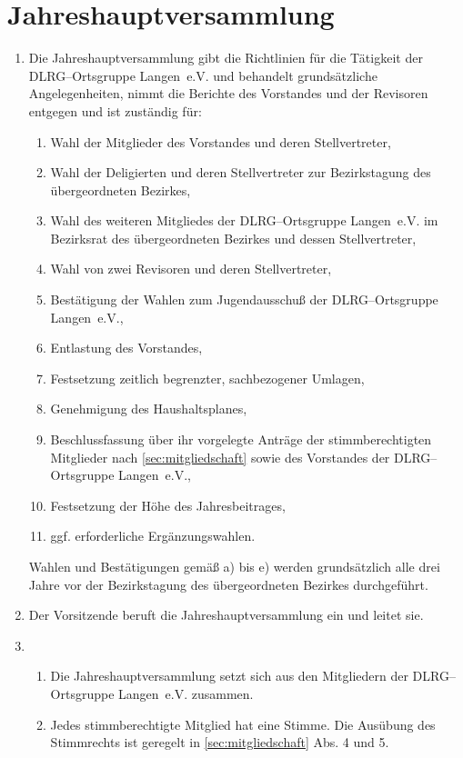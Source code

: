 \documentclass[%
12pt, %
a4paper, %
headsepline, %
footsepline, %
parskip, %
headings=normal, %
]{scrartcl}
\begin{document}
\section{Jahreshauptversammlung}
\label{sec:jahreshauptversammlung}
\begin{enumerate}
    \item Die Jahreshauptversammlung gibt die Richtlinien für die Tätigkeit der DLRG--Ortsgruppe Langen~e.V. und behandelt grundsätzliche Angelegenheiten, nimmt die Berichte des Vorstandes und der Revisoren entgegen und ist zuständig für: \begin{enumerate}[noitemsep]
        \item Wahl der Mitglieder des Vorstandes und deren Stellvertreter,
        \item Wahl der Deligierten und deren Stellvertreter zur Bezirkstagung des übergeordneten Bezirkes,
        \item Wahl des weiteren Mitgliedes der DLRG--Ortsgruppe Langen~e.V. im Bezirksrat des übergeordneten Bezirkes und dessen Stellvertreter,
        \item Wahl von zwei Revisoren und deren Stellvertreter,
        \item Bestätigung der Wahlen zum Jugendausschuß der DLRG--Ortsgruppe Langen~e.V.,
        \item Entlastung des Vorstandes,
        \item Festsetzung zeitlich begrenzter, sachbezogener Umlagen,
        \item Genehmigung des Haushaltsplanes,
        \item Beschlussfassung über ihr vorgelegte Anträge der stimmberechtigten Mitglieder nach \ref{sec:mitgliedschaft} sowie des Vorstandes der DLRG--Ortsgruppe Langen~e.V.,
        \item Festsetzung der Höhe des Jahresbeitrages,
        \item ggf. erforderliche Ergänzungswahlen.
    \end{enumerate}
    Wahlen und Bestätigungen gemäß a) bis e) werden grundsätzlich alle drei Jahre vor der Bezirkstagung des übergeordneten Bezirkes durchgeführt.
    \item Der Vorsitzende beruft die Jahreshauptversammlung ein und leitet sie.
    \item \begin{enumerate}[noitemsep]
        \item Die Jahreshauptversammlung setzt sich aus den Mitgliedern der DLRG--Ortsgruppe Langen~e.V. zusammen.
        \item Jedes stimmberechtigte Mitglied hat eine Stimme. Die Ausübung des Stimmrechts ist geregelt in \ref{sec:mitgliedschaft} Abs. 4 und 5.

\end{enumerate}
\end{enumerate}
\end{document}
